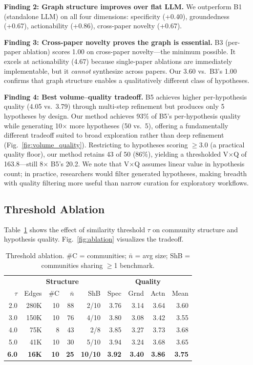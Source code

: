 \documentclass[conference]{IEEEtran}
\begin{document}
\textbf{Finding 2: Graph structure improves over flat LLM.}
We outperform B1 (standalone LLM) on all four dimensions: specificity (+0.40), groundedness (+0.67), actionability (+0.86), cross-paper novelty (+0.67).

\textbf{Finding 3: Cross-paper novelty proves the graph is essential.}
B3 (per-paper ablation) scores 1.00 on cross-paper novelty---the minimum possible.
It excels at actionability (4.67) because single-paper ablations are immediately implementable, but it \emph{cannot} synthesize across papers.
Our 3.60 vs.\ B3's 1.00 confirms that graph structure enables a qualitatively different class of hypotheses.

\textbf{Finding 4: Best volume--quality tradeoff.}
B5 achieves higher per-hypothesis quality (4.05 vs.\ 3.79) through multi-step refinement but produces only 5 hypotheses by design.
Our method achieves 93\% of B5's per-hypothesis quality while generating 10$\times$ more hypotheses (50 vs.\ 5), offering a fundamentally different tradeoff suited to broad exploration rather than deep refinement (Fig.~\ref{fig:volume_quality}).
Restricting to hypotheses scoring $\geq$3.0 (a practical quality floor), our method retains 43 of 50 (86\%), yielding a thresholded V$\times$Q of 163.8---still 8$\times$ B5's 20.2.
We note that V$\times$Q assumes linear value in hypothesis count; in practice, researchers would filter generated hypotheses, making breadth with quality filtering more useful than narrow curation for exploratory workflows.


\subsection{Threshold Ablation}

Table~\ref{tab:ablation} shows the effect of similarity threshold $\tau$ on community structure and hypothesis quality.
Fig.~\ref{fig:ablation} visualizes the tradeoff.

\begin{table}[t]
\caption{Threshold ablation. \#C = communities; $\bar{n}$ = avg size; ShB = communities sharing $\geq$1 benchmark.}
\label{tab:ablation}
\centering
\footnotesize
\setlength{\tabcolsep}{2.5pt}
\begin{tabular}{r|rrrr|rrrr}
\toprule
 & \multicolumn{4}{c|}{\textbf{Structure}} & \multicolumn{4}{c}{\textbf{Quality}} \\
$\tau$ & Edges & \#C & $\bar{n}$ & ShB & Spec & Grnd & Actn & Mean \\
\midrule
2.0 & 280K & 10 & 88 & 2/10 & 3.76 & 3.14 & 3.64 & 3.60 \\
3.0 & 150K & 10 & 76 & 4/10 & 3.80 & 3.08 & 3.42 & 3.55 \\
4.0 & 75K & 8 & 43 & 2/8 & 3.85 & 3.27 & 3.73 & 3.68 \\
5.0 & 41K & 10 & 30 & 5/10 & 3.94 & 3.24 & 3.68 & 3.65 \\
\textbf{6.0} & \textbf{16K} & \textbf{10} & \textbf{25} & \textbf{10/10} & \textbf{3.92} & \textbf{3.40} & \textbf{3.86} & \textbf{3.75} \\
\bottomrule
\end{tabular}
\end{table}
\end{document}
